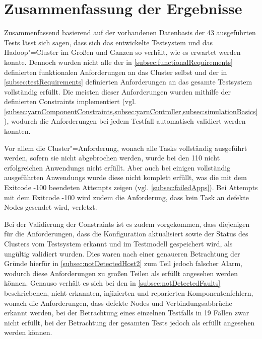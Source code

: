 \section{Zusammenfassung der Ergebnisse}
\label{sec:evaluationResults}

Zusammenfassend basierend auf der vorhandenen Datenbasis der 43 ausgeführten \glspl{Test} lässt sich sagen, dass sich das entwickelte Testsystem und das Hadoop"=Cluster im Großen und Ganzen so verhält, wie es erwartet werden konnte.
Dennoch wurden nicht alle der in \cref{subsec:functionalRequirements} definierten funktionalen Anforderungen an das Cluster selbst und der in \cref{subsec:testRequirements} definierten Anforderungen an das gesamte Testsystem vollständig erfüllt.
Die meisten dieser Anforderungen wurden mithilfe der definierten Constraints implementiert (vgl. \cref{subsec:yarnComponentConstraints,subsec:yarnController,subsec:simulationBasics}), wodurch die Anforderungen bei jedem \gls{Testfall} automatisch validiert werden konnten.

Vor allem die Cluster"=Anforderung, wonach alle Tasks vollständig ausgeführt werden, sofern sie nicht abgebrochen werden, wurde bei den 110 nicht erfolgreichen \glspl{Anwendung} nicht erfüllt.
Aber auch bei einigen vollständig ausgeführten \glspl{Anwendung} wurde diese nicht komplett erfüllt, was die mit dem Exitcode -100 beendeten \glspl{Attempt} zeigen (vgl. \cref{subsec:failedApps}).
Bei \glspl{Attempt} mit dem Exitcode -100 wird zudem die Anforderung, dass kein Task an defekte Nodes gesendet wird, verletzt.

Bei der Validierung der Constraints ist es zudem vorgekommen, dass diejenigen für die Anforderungen, dass die Konfiguration aktualisiert sowie der Status des Clusters vom Testsystem erkannt und im Testmodell gespeichert wird, als ungültig validiert wurden.
Dies waren nach einer genaueren Betrachtung der Gründe hierfür in \cref{subsec:notDetectedHost2} zum Teil jedoch falscher Alarm, wodurch diese Anforderungen zu großen Teilen als erfüllt angesehen werden können.
Genauso verhält es sich bei den in \cref{subsec:notDetectedFaults} beschriebenen, nicht erkannten, injizierten und reparierten Komponentenfehlern, wonach die Anforderungen, dass defekte Nodes und Verbindungsabbrüche erkannt werden, bei der Betrachtung eines einzelnen Testfalls in 19 Fällen zwar nicht erfüllt, bei der Betrachtung der gesamten \glspl{Test} jedoch als erfüllt angesehen werden können.

